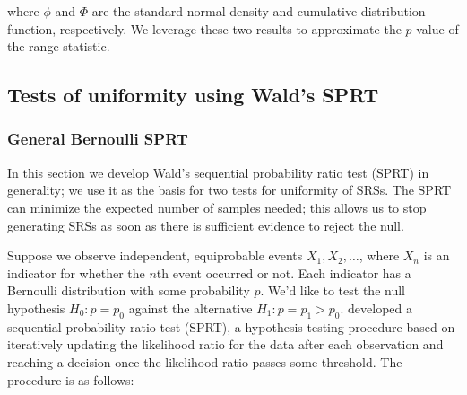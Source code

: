 \documentclass[12pt]{article}
\begin{document}
\noindent where $\phi$ and $\Phi$ are the standard normal density and cumulative distribution function, respectively. 
We leverage these two results to approximate the $p$-value of the range statistic.



%


\subsection{Tests of uniformity using Wald's SPRT}
\subsubsection{General Bernoulli SPRT}
In this section we develop Wald's sequential probability ratio test (SPRT) in generality;
we use it as the basis for two tests for uniformity of SRSs.
The SPRT can minimize the expected number of samples needed; this allows us to stop generating SRSs as soon as there is sufficient evidence to reject the null.

Suppose we observe independent, equiprobable events $X_1, X_2, \dots$, where $X_n$ is an indicator for whether the $n$th event occurred or not. 
Each indicator has a Bernoulli distribution with some probability $p$. 
We'd like to test the null hypothesis $H_0: p = p_0$ against the alternative $H_1: p = p_1 > p_0$. 
\citet{wald_sequential_1947} developed a sequential probability ratio test (SPRT), a hypothesis testing procedure based on iteratively updating the likelihood ratio for the data after each observation and reaching a decision once the likelihood ratio passes some threshold.
The procedure is as follows:
\end{document}
